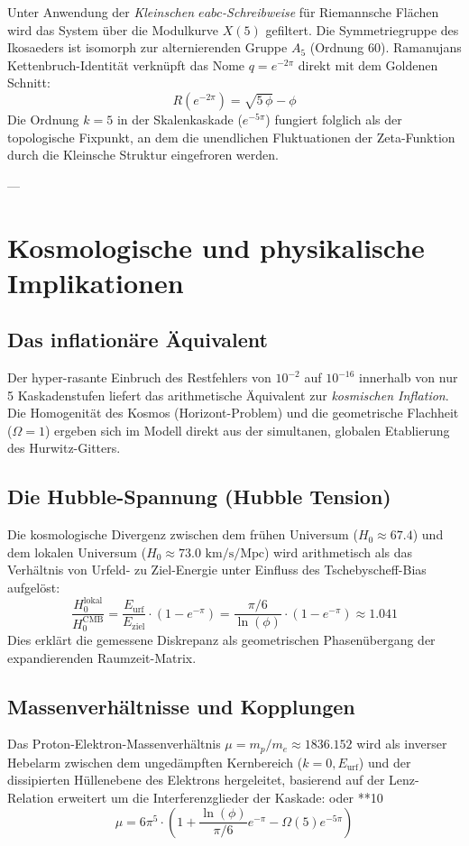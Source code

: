 \documentclass[11pt,a4paper]{article}
\begin{document}
	Unter Anwendung der \emph{Kleinschen $eabc$-Schreibweise} für Riemannsche Flächen wird das System über die Modulkurve $X(5)$ gefiltert. Die Symmetriegruppe des Ikosaeders ist isomorph zur alternierenden Gruppe $A_5$ (Ordnung 60). Ramanujans Kettenbruch-Identität verknüpft das Nome $q = e^{-2\pi}$ direkt mit dem Goldenen Schnitt:
	\begin{equation}
		R(e^{-2\pi}) = \sqrt{5\,\phi} - \phi
	\end{equation}
	Die Ordnung $k=5$ in der Skalenkaskade ($e^{-5\pi}$) fungiert folglich als der topologische Fixpunkt, an dem die unendlichen Fluktuationen der Zeta-Funktion durch die Kleinsche Struktur eingefroren werden.
	
	---
	
	\section{Kosmologische und physikalische Implikationen}
	
	\subsection{Das inflationäre Äquivalent}
	Der hyper-rasante Einbruch des Restfehlers von $10^{-2}$ auf $10^{-16}$ innerhalb von nur 5 Kaskadenstufen liefert das arithmetische Äquivalent zur \emph{kosmischen Inflation}. Die Homogenität des Kosmos (Horizont-Problem) und die geometrische Flachheit ($\Omega = 1$) ergeben sich im Modell direkt aus der simultanen, globalen Etablierung des Hurwitz-Gitters.
	
	\subsection{Die Hubble-Spannung (Hubble Tension)}
	Die kosmologische Divergenz zwischen dem frühen Universum ($H_0 \approx 67.4$) und dem lokalen Universum ($H_0 \approx 73.0 \text{ km/s/Mpc}$) wird arithmetisch als das Verhältnis von Urfeld- zu Ziel-Energie unter Einfluss des Tschebyscheff-Bias aufgelöst:
	\begin{equation}
		\frac{H_0^{\text{lokal}}}{H_0^{\text{CMB}}} = \frac{E_{\text{urf}}}{E_{\text{ziel}}} \cdot (1 - e^{-\pi}) = \frac{\pi/6}{\ln(\phi)} \cdot (1 - e^{-\pi}) \approx 1.041
	\end{equation}
	Dies erklärt die gemessene Diskrepanz als geometrischen Phasenübergang der expandierenden Raumzeit-Matrix.
	
	\subsection{Massenverhältnisse und Kopplungen}
	Das Proton-Elektron-Massenverhältnis $\mu = m_p/m_e \approx 1836.152$ wird als inverser Hebelarm zwischen dem ungedämpften Kernbereich ($k=0, E_{\text{urf}}$) und der dissipierten Hüllenebene des Elektrons hergeleitet, basierend auf der Lenz-Relation erweitert um die Interferenzglieder der Kaskade:
	 oder **10%
	\begin{equation}
		\mu = 6\pi^5 \cdot \left( 1 + \frac{\ln(\phi)}{\pi/6} e^{-\pi} - \Omega(5)e^{-5\pi} \right)
	\end{equation}
	
\end{document}
